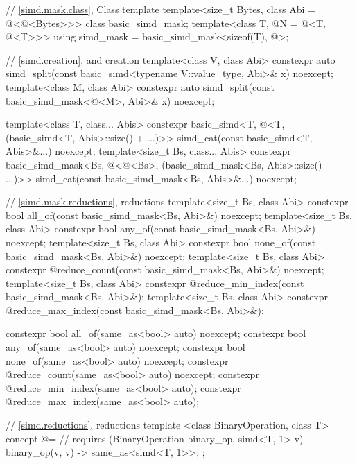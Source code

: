 \begin{codeblock}
{  // \ref{simd.mask.class}, Class template 
  template<size_t Bytes, class Abi = @\nativeabi@<@\integerfrom@<Bytes>>> class basic_simd_mask;
  template<class T, @\simdsizetype@ N = @\simdsizev@<T, @\nativeabi@<T>>>
    using simd_mask = basic_simd_mask<sizeof(T), @>;

  // \ref{simd.creation},  and  creation
  template<class V, class Abi>
    constexpr auto
      simd_split(const basic_simd<typename V::value_type, Abi>& x) noexcept;
  template<class M, class Abi>
    constexpr auto
      simd_split(const basic_simd_mask<@\maskelementsize@<M>, Abi>& x) noexcept;

  template<class T, class... Abis>
    constexpr basic_simd<T, @\deducet@<T, (basic_simd<T, Abis>::size() + ...)>>
      simd_cat(const basic_simd<T, Abis>&...) noexcept;
  template<size_t Bs, class... Abis>
    constexpr basic_simd_mask<Bs, @\deducet@<@\integerfrom@<Bs>,
                              (basic_simd_mask<Bs, Abis>::size() + ...)>>
      simd_cat(const basic_simd_mask<Bs, Abis>&...) noexcept;

  // \ref{simd.mask.reductions},  reductions
  template<size_t Bs, class Abi>
    constexpr bool all_of(const basic_simd_mask<Bs, Abi>&) noexcept;
  template<size_t Bs, class Abi>
    constexpr bool any_of(const basic_simd_mask<Bs, Abi>&) noexcept;
  template<size_t Bs, class Abi>
    constexpr bool none_of(const basic_simd_mask<Bs, Abi>&) noexcept;
  template<size_t Bs, class Abi>
    constexpr @\simdsizetype@ reduce_count(const basic_simd_mask<Bs, Abi>&) noexcept;
  template<size_t Bs, class Abi>
    constexpr @\simdsizetype@ reduce_min_index(const basic_simd_mask<Bs, Abi>&);
  template<size_t Bs, class Abi>
    constexpr @\simdsizetype@ reduce_max_index(const basic_simd_mask<Bs, Abi>&);

  constexpr bool all_of(same_as<bool> auto) noexcept;
  constexpr bool any_of(same_as<bool> auto) noexcept;
  constexpr bool none_of(same_as<bool> auto) noexcept;
  constexpr @\simdsizetype@ reduce_count(same_as<bool> auto) noexcept;
  constexpr @\simdsizetype@ reduce_min_index(same_as<bool> auto);
  constexpr @\simdsizetype@ reduce_max_index(same_as<bool> auto);

  // \ref{simd.reductions},  reductions
  template <class BinaryOperation, class T>
    concept @\reductionoperation@ =                                    // \expos
      requires (BinaryOperation binary_op, simd<T, 1> v) {
        { binary_op(v, v) } -> same_as<simd<T, 1>>;
      };

}
\end{codeblock}
